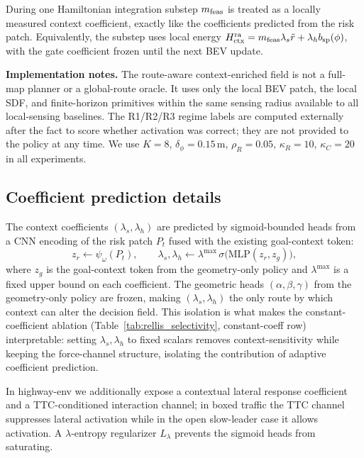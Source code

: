 During one Hamiltonian integration substep $m_{\rm feas}$ is treated as
a locally measured context coefficient, exactly like the coefficients
predicted from the risk patch.
Equivalently, the substep uses local energy
$H_{\rm ctx}^{\rm ra}=m_{\rm feas}\lambda_s\tilde r+\lambda_h b_{\rm sp}(\phi)$,
with the gate coefficient frozen until the next BEV update.

\textbf{Implementation notes.}
The route-aware context-enriched field is not a full-map planner or a global-route oracle.
It uses only the local BEV patch, the local SDF, and finite-horizon
primitives within the same sensing radius available to all local-sensing
baselines.
The R1/R2/R3 regime labels are computed externally after the fact to
score whether activation was correct; they are not provided to the policy
at any time.
We use $K{=}8$, $\delta_\phi{=}0.15$\,m, $\rho_R{=}0.05$,
$\kappa_R{=}10$, $\kappa_C{=}20$ in all experiments.

\subsection{Coefficient prediction details}
\label{app:coeff_pred}

The context coefficients $(\lambda_s,\lambda_h)$ are predicted by
sigmoid-bounded heads from a CNN encoding of the risk patch $P_t$ fused
with the existing goal-context token:
\begin{equation}
z_r \leftarrow \psi_\omega(P_t),
\qquad
\lambda_s, \lambda_h \leftarrow \lambda^{\max}\,\sigma\!\bigl(\mathrm{MLP}(z_r,z_g)\bigr),
\end{equation}
where $z_g$ is the goal-context token from the geometry-only policy and $\lambda^{\max}$
is a fixed upper bound on each coefficient.
The geometric heads $(\alpha,\beta,\gamma)$ from the geometry-only policy are frozen,
making $(\lambda_s,\lambda_h)$ the only route by which context can alter
the decision field.
This isolation is what makes the constant-coefficient ablation
(Table~\ref{tab:rellis_selectivity}, constant-coeff row) interpretable:
setting $\lambda_s,\lambda_h$ to fixed scalars removes context-sensitivity
while keeping the force-channel structure, isolating the contribution of
adaptive coefficient prediction.

In highway-env we additionally expose a contextual lateral response
coefficient and a TTC-conditioned interaction channel; in boxed traffic
the TTC channel suppresses lateral activation while in the open
slow-leader case it allows activation.
A $\lambda$-entropy regularizer $L_\lambda$ prevents the sigmoid heads
from saturating.

